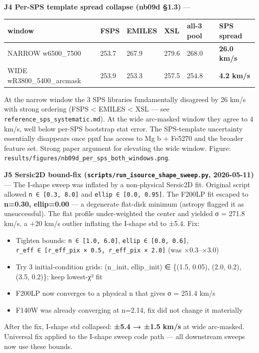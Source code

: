\documentclass[
  10pt,
]{article}
\providecommand{\tightlist}{%
  \setlength{\itemsep}{0pt}\setlength{\parskip}{0pt}}
\begin{document}
\textbf{J4 Per-SPS template spread collapse (nb09d §1.3)} ---

\begingroup\small\setlength{\tabcolsep}{4pt}\begin{longtable}[]{@{}llllll@{}}
\toprule
window & FSPS & EMILES & XSL & all-3 pool & SPS spread \\
\midrule
\endhead
NARROW w6500\_7500 & 253.7 & 267.9 & 279.6 & 268.0 & \textbf{26.0 km/s} \\
WIDE wR3800\_5400\_arcmask & 253.9 & 253.3 & 257.5 & 254.8 & \textbf{4.2 km/s} \\
\bottomrule
\end{longtable}\endgroup

At the narrow window the 3 SPS libraries fundamentally disagreed by 26 km/s with strong ordering (FSPS \textless{} EMILES \textless{} XSL --- see \texttt{reference\_sps\_systematic.md}). At the wide
arc-masked window they agree to 4 km/s, well below per-SPS bootstrap stat error. The SPS-template uncertainty essentially disappears once ppxf has access to Mg b + Fe5270 and the broader feature set.
Strong paper argument for elevating the wide window. Figure: \texttt{results/figures/nb09d\_per\_sps\_both\_windows.png}.

\textbf{J5 Sersic2D bound-fix (\texttt{scripts/run\_isource\_shape\_sweep.py}, 2026-05-11)} --- The I-shape sweep was inflated by a non-physical Sersic2D fit. Original script allowed
\texttt{n\ ∈\ {[}0.3,\ 8.0{]}} and \texttt{ellip\ ∈\ {[}0.0,\ 0.95{]}}. The F200LP fit escaped to \textbf{n=0.30, ellip=0.00} --- a degenerate flat-disk minimum (astropy flagged it as unsuccessful).
The flat profile under-weighted the center and yielded σ = 271.8 km/s, a +20 km/s outlier inflating the I-shape std to ±5.4. Fix:

\begin{itemize}
\tightlist
\item
  Tighten bounds: \texttt{n\ ∈\ {[}1.0,\ 6.0{]}}, \texttt{ellip\ ∈\ {[}0.0,\ 0.6{]}}, \texttt{r\_eff\ ∈\ {[}r\_eff\_pix\ ×\ 0.5,\ r\_eff\_pix\ ×\ 2.0{]}} (was ×0.3--×3.0)
\item
  Try 3 initial-condition grids: (n\_init, ellip\_init) ∈ \{(1.5, 0.05), (2.0, 0.2), (3.5, 0.2)\}; keep lowest-χ² fit
\item
  F200LP now converges to a physical n that gives σ = 251.4 km/s
\item
  F140W was already converging at n=2.14, fix did not change it materially
\end{itemize}

After the fix, I-shape std collapsed: \textbf{±5.4 → ±1.5 km/s} at wide arc-masked. Universal fix applied to the I-shape sweep code path --- all downstream sweeps now use these bounds.
\end{document}
